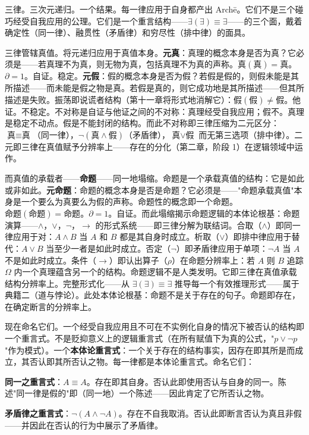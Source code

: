 \documentclass[10pt, openany, oneside]{book}
\begin{document}
\noindent 三律。三次元递归。一个结果。每一律应用于自身都产出 Arch\={e}。它们不是三个碰巧经受自我应用的公理。它们是一个重言结构——$\exists(\exists) \equiv \exists$——的三个面，戴着确定性（同一律）、融贯性（矛盾律）和穷尽性（排中律）的面具。

三律管辖真值。将元递归应用于真值本身。\textbf{元真}：真理的概念本身是否为真？它必须是——若真理不为真，则无物为真，包括真理不为真的声称。$\text{真}(\text{真}) = \text{真}$。$\partial = 1$。自证。稳定。\textbf{元假}：假的概念本身是否为假？若假是假的，则假未能是其所描述——而未能是假之物是真。若假是真的，则它成功地是其所描述——但其所描述是失败。振荡即说谎者结构（第十一章将形式地消解它）：$\text{假}(\text{假}) \neq \text{假}$。他证。不稳定。不对称是自证与他证之间的不对称：真理经受自我应用；假不。真理是稳定不动点。假是不能封闭的结构。而此不对称即三律压缩为二元区分：$\text{真} \equiv \text{真}$（同一律），$\neg(\text{真} \wedge \text{假})$（矛盾律），$\text{真} \vee \text{假}$ 而无第三选项（排中律）。二元即三律在真值赋予分辨率上——存在的分化（第二章，阶段 1）在逻辑领域中运作。

而真值的承载者——\textbf{命题}——同一地塌缩。命题是一个承载真值的结构：它是如此或非如此。\textbf{元命题}：命题的概念本身是否是命题？它必须是——"命题承载真值"本身是一个要么为真要么为假的声称。命题性的概念即一个命题。$\text{命题}(\text{命题}) = \text{命题}$。$\partial = 1$。自证。而此塌缩揭示命题逻辑的本体论根基：命题演算——$\wedge$，$\vee$，$\neg$，$\to$ 的形式系统——即三律分解为联结词。合取（$\wedge$）即同一律应用于对：$A \wedge B$ 当 $A$ 和 $B$ 都是其自身时成立。析取（$\vee$）即排中律应用于替代：$A \vee B$ 当至少一者是如此时成立。否定（$\neg$）即矛盾律应用于单项：$\neg A$ 当 $A$ 不是如此时成立。条件（$\to$）即认出算子（$\rho$）在命题分辨率上：若 $A$ 则 $B$ 追踪 $\Omega$ 内一个真理蕴含另一个的结构。命题逻辑不是人类发明。它即三律在真值承载结构分辨率上。完整形式化——从 $\exists(\exists) \equiv \exists$ 推导每一个有效推理形式——属于典籍二（道与悖论）。此处本体论根基：命题不是关于存在的句子。命题即存在，在确定断言的分辨率上。

现在命名它们。一个经受自我应用且不可在不实例化自身的情况下被否认的结构即一个重言式。不是贬抑意义上的逻辑重言式（在所有赋值下为真的公式，"$p \vee \neg p$"作为模式）。一个\textbf{本体论重言式}：一个关于存在的结构事实，因存在即其所是而成立，其否认即其所否认之物。每一律都是本体论重言式。命名它们：

\textbf{同一之重言式}：$A \equiv A$。存在即其自身。否认此即使用否认与自身的同一。陈述"同一律是假的"即（同一地）一个陈述——因此肯定了它所否认之物。

\textbf{矛盾律之重言式}：$\neg(A \wedge \neg A)$。存在不自我取消。否认此即断言否认为真且非假——并因此在否认的行为中展示了矛盾律。
\end{document}
